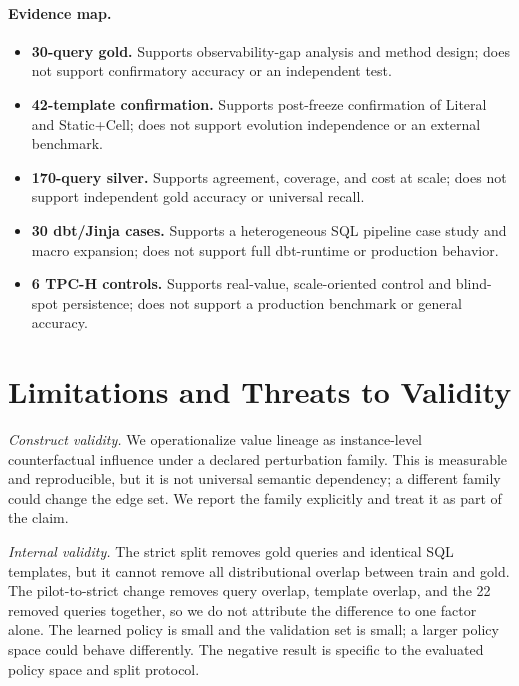 \documentclass[sigconf, nonacm]{acmart}
\begin{document}
\paragraph{Evidence map.}
\begin{itemize}
\item \textbf{30-query gold.} Supports observability-gap analysis and method design; does not support confirmatory accuracy or an independent test.
\item \textbf{42-template confirmation.} Supports post-freeze confirmation of Literal and Static+Cell; does not support evolution independence or an external benchmark.
\item \textbf{170-query silver.} Supports agreement, coverage, and cost at scale; does not support independent gold accuracy or universal recall.
\item \textbf{30 dbt/Jinja cases.} Supports a heterogeneous SQL pipeline case study and macro expansion; does not support full dbt-runtime or production behavior.
\item \textbf{6 TPC-H controls.} Supports real-value, scale-oriented control and blind-spot persistence; does not support a production benchmark or general accuracy.
\end{itemize}

\section{Limitations and Threats to Validity}
\label{app:limitations}

\emph{Construct validity.} We operationalize value lineage as instance-level
counterfactual influence under a declared perturbation family. This is measurable
and reproducible, but it is not universal semantic dependency; a different
family could change the edge set. We report the family explicitly and treat it
as part of the claim.

\emph{Internal validity.} The strict split removes gold queries and identical
SQL templates, but it cannot remove all distributional overlap between train and
gold. The pilot-to-strict change removes query overlap, template overlap, and the
22 removed queries together, so we do not attribute the difference to one factor
alone. The learned policy is small and the validation set is small; a larger
policy space could behave differently. The negative result is specific to the
evaluated policy space and split protocol.
\end{document}
